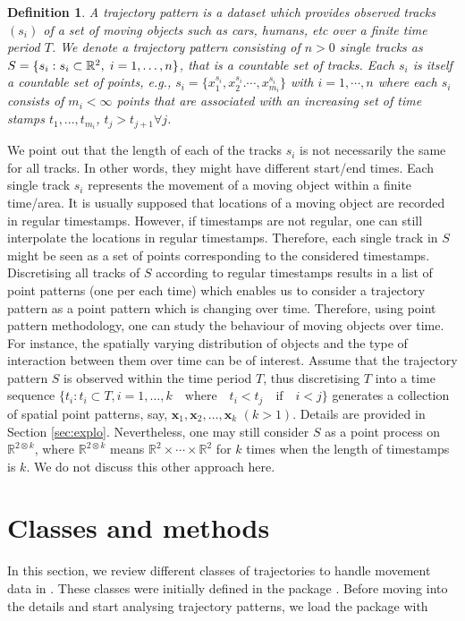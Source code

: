 \documentclass[article]{jss}
\newcommand{\R}{\mathbb{R}}
\newtheorem{definition}{Definition}[section]
\begin{document}
  \begin{definition}
A \textit{trajectory pattern} is a dataset which provides observed 
tracks $(s_i)$ of a set of moving objects such as cars, humans, etc over a finite time period $T$. We denote a trajectory pattern consisting of  $n>0$ single tracks as $S=\{s_i: s_i \subset \R^2, \hspace{1mm} i=1,\ldots,n  \}$, that is a countable set of tracks. Each $s_i$ is itself a countable set of points, e.g., $s_i=\{x_1^{s_i},x_2^{s_i}.\cdots, x_{m_i}^{s_i} \}$ with $i=1,\cdots,n$ where each $s_i$ consists of $m_i<\infty$ points that are associated with an increasing set of time stamps $t_1,...,t_{m_i}$, $t_j > t_{j+1} \forall j$.
\end{definition}
  We point out that the length of each of the tracks $s_i$ is not necessarily the same for all tracks. In other words, they might have different start/end times. Each single track $s_i$ represents the movement of a moving object within a finite time/area. It is usually supposed that locations of a moving object are recorded in regular timestamps. However, if timestamps are not regular, one can still interpolate the locations in regular timestamps. Therefore, each single track in $S$ might be seen as a set of points corresponding to the considered timestamps. Discretising all tracks of $S$ according to regular timestamps results in a list of point patterns (one per each time) which enables us to consider a trajectory pattern as a point pattern which is changing over time. Therefore, using point pattern methodology, one can study the behaviour of moving objects over time. For instance, the spatially varying distribution of objects and the type of interaction between them over time can be of interest. Assume that the trajectory pattern $S$ is observed within the time period $T$, thus discretising $T$ into a time sequence $\{t_i: t_i \subset T, i=1,\ldots,k \quad \text{where} \quad t_i < t_j \quad \text{if} \quad i< j \}$ generates a collection of spatial point patterns, say, $\textbf{x}_1,\textbf{x}_2, \ldots, \textbf{x}_k$ $(k>1)$.  Details are provided in Section \ref{sec:explo}. Nevertheless, one may still consider $S$ as a point process on $\R^{2\otimes k}$, where $\R^{2\otimes k}$ means $\R^2 \times \cdots \times \R^2$ for $k$ times when the length of timestamps is $k$. We do not discuss this other approach here.

\section{Classes and methods} \label{sec:classes}
In this section, we review different classes of trajectories to handle movement data in . These classes were initially defined in the  package  \citep{spacetime}. Before moving into the details and start analysing trajectory patterns, we load the package with
\end{document}

